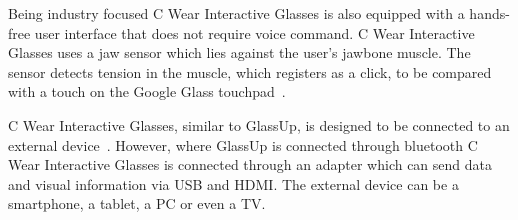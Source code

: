 Being industry focused C Wear Interactive Glasses is also equipped with a hands-free user interface  that does not require voice command. C Wear Interactive Glasses uses a jaw sensor which lies against the user's jawbone muscle. The sensor detects tension in the muscle, which registers as a click, to be compared with a touch on the Google Glass touchpad~\cite{pennyProducts}.

C Wear Interactive Glasses, similar to GlassUp, is designed to be connected to an external device~\cite{pennyProducts}. However, where GlassUp is connected through bluetooth C Wear Interactive Glasses is connected through an adapter which can send data and visual information via USB and HDMI. The external device can be a smartphone, a tablet, a PC or even a TV.
